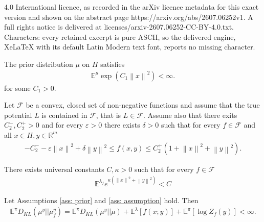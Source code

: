 \documentclass[10pt,a4paper]{amsart}
\newcommand{\E}{{\mathbb E}}
\newcommand{\F}{\mathcal{F}}
\newcommand{\KL}[2]{D_{KL}\left(#1 || #2\right)}
\newcommand{\R}{{\mathbb R}}
\newcommand{\norm}[1]{\left\|#1\right\|}
\begin{document}
4.0 International licence, as recorded in the arXiv licence metadata for this exact version and shown on the abstract page https://arxiv.org/abs/2607.06252v1. A full rights notice is delivered at licenses/arxiv-2607.06252-CC-BY-4.0.txt. Characters: every retained excerpt is pure ASCII, so the delivered engine, XeLaTeX with its default Latin Modern text font, reports no missing character.
\begin{assumption}
    \label{ass: prior}
    The prior distribution $\mu$ on $H$ satisfies 
    \begin{eqnarray}\label{eq: sub gaussian prior}
        \E^{\mu} \exp(C_1 \norm{x}^2) < \infty.
    \end{eqnarray}
    for some $C_1>0$.
\end{assumption}

\begin{assumption}\label{ass: assumption}
     Let $\F$ be a convex, closed set of non-negative functions and assume that the true potential $L$ is contained in $\F$, that is $L \in \F$. Assume also that there exits $C_2^-, C_2^+ > 0$ and for every $\varepsilon > 0$ there exists $\delta >0$ such that for every $f \in \F$ and all $x \in H, y \in \R^m$
        \begin{eqnarray}\label{eq: bounds on f}
             -C_2^- - \varepsilon \norm{x}^2   +\delta \norm{y}^2 \le f(x, y) \le C_2^+  (1 + \norm{x}^2   +\norm{y}^2).
        \end{eqnarray}
\end{assumption}

  \begin{lemma}\label{lem: subgaussian joint}
    There exists universal constants $C, \kappa>0$ such that for every $f \in \F$
    \begin{eqnarray*}
       \E^{\lambda_f} e^{\kappa (\norm{x}^2 + \norm{y}^2)}   < C
    \end{eqnarray*}
\end{lemma}

\begin{lemma}\label{lem: basic lemma}
    Let Assumptions  \ref{ass: prior} and \ref{ass: assumption} hold. Then 
    \begin{eqnarray*}
         \E^\pi\KL{\mu^y}{\mu^y_f}
     =  \E^\pi \KL{\mu^y}{\mu} + \E^{\lambda}[f(x;y)] + \E^\pi[\log Z_f(y)]< \infty.
    \end{eqnarray*}
\end{lemma}
\end{document}
